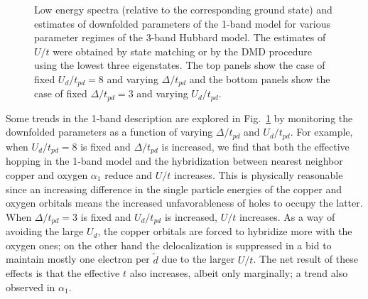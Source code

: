 \begin{figure}[]
\caption{Low energy spectra (relative to the corresponding ground state) 
and estimates of downfolded parameters of the 1-band model for various parameter regimes of the 3-band Hubbard model. 
The estimates of $U/t$ were obtained by state matching or by the DMD procedure using 
the lowest three eigenstates. The top panels show the case of fixed $U_d/t_{pd}=8$ and varying $\Delta/t_{pd}$ 
and the bottom panels show the case of fixed $\Delta/t_{pd}=3$ and varying $U_d/t_{pd}$.}
\label{fig:varyUdep} 
\end{figure}	
 
Some trends in the 1-band description are explored in Fig.~\ref{fig:varyUdep} 
by monitoring the downfolded parameters as a function of varying $\Delta/t_{pd}$ and $U_d/t_{pd}$. 
For example, when $U_d/t_{pd}=8$ is fixed and $\Delta/t_{pd}$ is increased, we find that both 
the effective hopping in the 1-band model and the hybridization between nearest neighbor copper and oxygen $\alpha_1$ 
reduce and $U/t$ increases. This is physically reasonable since an increasing difference in the 
single particle energies of the copper and oxygen orbitals means the increased unfavorableness of holes 
to occupy the latter. When $\Delta/t_{pd}=3$ is fixed and $U_d/t_{pd}$ is increased, $U/t$ increases. 
As a way of avoiding the large $U_d$, the copper orbitals are forced to hybridize more with the oxygen ones; 
on the other hand the delocalization is suppressed in a bid to maintain mostly 
one electron per $\tilde{d}$ due to the larger $U/t$. 
The net result of these effects is that the effective $t$ also increases, albeit only marginally; a trend also observed in $\alpha_1$.


